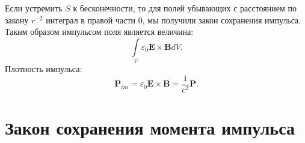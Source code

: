 \documentclass[a4paper,14pt]{extreport} %
\renewcommand{\vec}[1]{\bm{#1}}
\newcommand{\eps}{\varepsilon}
\begin{document}
	Если устремить $S$ к бесконечности, то для полей убывающих с расстоянием по закону $r^{-2}$ интеграл в правой части 0, мы получили закон сохранения импульса. Таким образом импульсом поля является величина:
	\begin{equation*}
		\int\limits_{V} \eps_0 \vec{E}\times\vec{B} dV.
	\end{equation*}
	Плотность импульса:
	\begin{equation*}
		\vec{P}_{im} = \eps_0 \vec{E}\times\vec{B} = \frac{1}{c^2} \vec{P}.
	\end{equation*}
	
	\section{Закон сохранения момента импульса}
	
\end{document}
